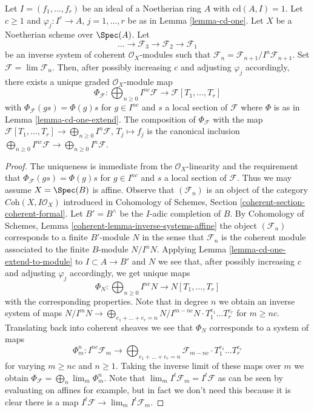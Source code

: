 \begin{lemma}
\label{lemma-cd-is-one-for-system}
Let $I = (f_1, \ldots, f_r)$ be an ideal of a Noetherian ring $A$ with
$\text{cd}(A, I) = 1$. Let $c \geq 1$ and $\varphi_j : I^c \to A$,
$j = 1, \ldots, r$ be as in Lemma \ref{lemma-cd-one}.
Let $X$ be a Noetherian scheme over $\Spec(A)$. Let
$$
\ldots \to \mathcal{F}_3 \to \mathcal{F}_2 \to \mathcal{F}_1
$$
be an inverse system of coherent $\mathcal{O}_X$-modules
such that $\mathcal{F}_n = \mathcal{F}_{n + 1}/I^n\mathcal{F}_{n + 1}$.
Set $\mathcal{F} = \lim \mathcal{F}_n$.
Then, after possibly increasing $c$ and adjusting $\varphi_j$ accordingly,
there exists a unique graded $\mathcal{O}_X$-module map
$$
\Phi_\mathcal{F} :
\bigoplus\nolimits_{n \geq 0} I^{nc}\mathcal{F}
\longrightarrow
\mathcal{F}[T_1, \ldots, T_r]
$$
with $\Phi_\mathcal{F}(g s) = \Phi(g) s$ for $g \in I^{nc}$ and
$s$ a local section of $\mathcal{F}$ where $\Phi$ is as in
Lemma \ref{lemma-cd-one-extend}. The composition of $\Phi_\mathcal{F}$
with the map
$\mathcal{F}[T_1, \ldots, T_r] \to \bigoplus_{n \geq 0} I^n\mathcal{F}$,
$T_j \mapsto f_j$
is the canonical inclusion
$\bigoplus_{n \geq 0} I^{nc}\mathcal{F} \to
\bigoplus_{n \geq 0} I^n\mathcal{F}$.
\end{lemma}

\begin{proof}
The uniqueness is immediate from the $\mathcal{O}_X$-linearity
and the requirement that $\Phi_\mathcal{F}(g s) = \Phi(g) s$ for
$g \in I^{nc}$ and $s$ a local section of $\mathcal{F}$.
Thus we may assume $X = \Spec(B)$ is affine.
Observe that $(\mathcal{F}_n)$ is an object of the category
$\textit{Coh}(X, I\mathcal{O}_X)$ introduced
in Cohomology of Schemes, Section \ref{coherent-section-coherent-formal}.
Let $B' = B^\wedge$ be the $I$-adic completion of $B$.
By Cohomology of Schemes, Lemma \ref{coherent-lemma-inverse-systems-affine}
the object $(\mathcal{F}_n)$ corresponds to a finite $B'$-module $N$
in the sense that $\mathcal{F}_n$ is the coherent
module associated to the finite $B$-module $N/I^n N$.
Applying Lemma \ref{lemma-cd-one-extend-to-module}
to $I \subset A \to B'$ and $N$
we see that, after possibly increasing $c$ and adjusting
$\varphi_j$ accordingly, we get unique maps
$$
\Phi_N : \bigoplus\nolimits_{n \geq 0} I^{nc}N \to N[T_1, \ldots, T_r]
$$
with the corresponding properties. Note that in degree $n$ we obtain
an inverse system of maps $N/I^mN \to \bigoplus_{e_1 + \ldots + e_r = n}
N/I^{m - nc}N \cdot T_1^{e_1} \ldots T_r^{e_r}$ for $m \geq nc$.
Translating back into coherent
sheaves we see that $\Phi_N$ corresponds to a system of maps
$$
\Phi^n_m :
I^{nc}\mathcal{F}_m
\longrightarrow
\bigoplus\nolimits_{e_1 + \ldots + e_r = n}
\mathcal{F}_{m - nc} \cdot T_1^{e_1} \ldots T_r^{e_r}
$$
for varying $m \geq nc$ and $n \geq 1$. Taking the inverse limit of
these maps over $m$ we obtain $\Phi_\mathcal{F} = \bigoplus_n \lim_m \Phi^n_m$.
Note that $\lim_m I^t\mathcal{F}_m = I^t \mathcal{F}$ as can be seen by
evaluating on affines for example, but in fact we don't need this because
it is clear there is a map $I^t\mathcal{F} \to \lim_m I^t\mathcal{F}_m$.
\end{proof}


